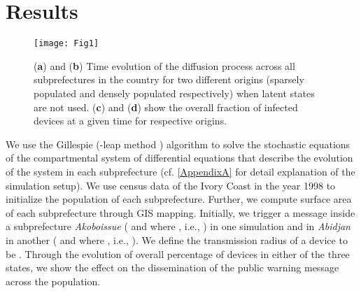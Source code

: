 \documentclass[review]{elsarticle}
\begin{document}
\begin{figure*}[htb]
\centering
\begin{minipage}{1.0\textwidth}
\small

\end{minipage}
\label{eq:N_SimpleSIRbeamLatentVincent}
\end{figure*}

\section{Results}\label{sec:simresult}

\begin{figure}
    \centering
    \texttt{[image: Fig1]}
    \caption{(\textbf{a}) and (\textbf{b}) Time evolution of the diffusion process across all subprefectures in the country for two different origins (sparsely populated and densely populated respectively) when latent states are not used. (\textbf{c}) and (\textbf{d}) show the overall fraction of infected devices at a given time for respective origins.}
    \label{fig:sirgillespi}
\end{figure}


We use the Gillespie (-leap method \cite{Gillespie2001, Gillespie2006}) algorithm to solve the stochastic equations of the compartmental system of  differential equations that describe the evolution of the system in each subprefecture (cf. \ref{AppendixA} for detail explanation of the simulation setup). We use census data of the Ivory Coast in the year 1998 \cite{Web1} to initialize the population of each subprefecture. Further, we compute surface area of each subprefecture through GIS mapping. Initially, we trigger a message inside a subprefecture \emph{Akoboissue} ( and   where , i.e., ) in one simulation and in \emph{Abidjan} in another ( and   where , i.e., ). We define the transmission radius of a device to be  . Through the evolution of overall percentage of devices in either of the three states, we show the effect on the dissemination of the public warning message across the population.
\end{document}
